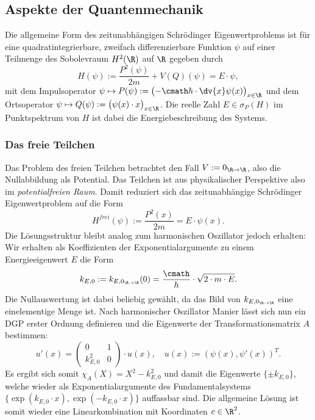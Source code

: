 \documentclass[../main.tex]{subfiles}
\begin{document}
    \subsection{Aspekte der Quantenmechanik}
        Die allgemeine Form des zeitunabhängigen Schrödinger Eigenwertproblems ist für eine quadratintegrierbare, zweifach differenzierbare Funktion $\psi$ auf einer Teilmenge des Sobolevraum $H^2(\R)$ auf $\R$ gegeben durch
        \[
            H(\psi) := \frac{P^2(\psi)}{2m} + V(Q)(\psi) = E\cdot\psi,
        \]
        mit dem Impulsoperator $\psi\mapsto P(\psi):=\bigl(-\cmath\hbar\cdot\dv{x}\psi(x)\bigr)_{x\in\R}$ und dem Ortsoperator $\psi\mapsto Q(\psi):=\bigl(\psi(x)\cdot x\bigr)_{x\in\R}$. Die reelle Zahl $E\in\sigma_P(H)$ im Punktspektrum von $H$ ist dabei die Energiebeschreibung des Systems.
        \subsubsection{Das freie Teilchen}
            Das Problem des freien Teilchen betrachtet den Fall $V:=0_{\R\to\R}$, also die Nullabbildung als Potential. Das Teilchen ist aus physikalischer Perspektive also im \emph{potentialfreien Raum}. Damit reduziert sich das zeitunabhängige Schrödinger Eigenwertproblem auf die Form 
            \[
                H^\textit{frei}(\psi):= \frac{P^2(x)}{2m} = E\cdot\psi(x).
            \]
            Die Lösungsstruktur bleibt analog zum harmonischen Oszillator jedoch erhalten: Wir erhalten als Koeffizienten der Exponentialargumente zu einem Energieeigenwert $E$ die Form 
            \[
                k_{E,0} := k_{E,0_{\R\to\R}}(0) = \frac{\cmath}{\hbar}\cdot\sqrt{2\cdot m\cdot E}. 
            \]
            Die Nullauswertung ist dabei beliebig gewählt, da das Bild von $k_{E,0_{\R\to\R}}$ eine einelementige Menge ist. Nach harmonischer Oszillator Manier lässt sich nun ein DGP erster Ordnung definieren und die Eigenwerte der Transformationsmatrix $A$ bestimmen:
            \[
                u'(x) = \begin{pmatrix}
                    0 & 1\\
                    k_{E,0}^2 & 0
                \end{pmatrix}\cdot u(x),\quad u(x):=(\psi(x), \psi'(x))^T.
            \]
            Es ergibt sich somit $\chi_A(X) = X^2 - k_{E,0}^2$ und damit die Eigenwerte $\{\pm k_{E,0}\}$, welche wieder als Exponentialargumente des Fundamentalsystems $\{\exp(k_{E,0}\cdot x), \exp(-k_{E,0}\cdot x)\}$ auffassbar sind. Die allgemeine Lösung ist somit wieder eine Linearkombination mit Koordinaten $c\in\R^2$. 
            
\end{document}
